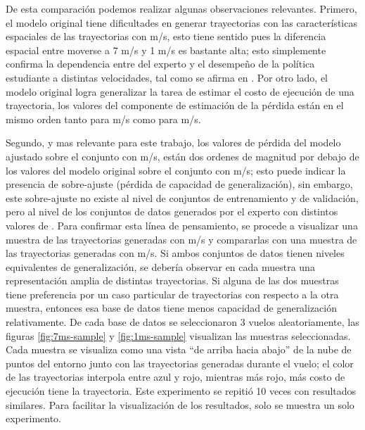 De esta comparación podemos realizar algunas observaciones relevantes. Primero, el modelo original tiene dificultades en generar trayectorias con las características espaciales de las trayectorias con  m/s, esto tiene sentido pues la diferencia espacial entre moverse a 7 m/s y 1 m/s es bastante alta; esto simplemente confirma la dependencia entre  del experto y el desempeño de la política estudiante a distintas velocidades, tal como se afirma en \cite{Loquercio2021}. Por otro lado, el modelo original logra generalizar la tarea de estimar el costo de ejecución de una trayectoria, los valores del componente de estimación de la pérdida están en el mismo orden tanto para  m/s como para  m/s. 

Segundo, y mas relevante para este trabajo, los valores de pérdida del modelo ajustado sobre el conjunto con  m/s, están dos ordenes de magnitud por debajo de los valores del modelo original sobre el conjunto con  m/s; esto puede indicar la presencia de sobre-ajuste (pérdida de capacidad de generalización), sin embargo, este sobre-ajuste no existe al nivel de conjuntos de entrenamiento y de validación, pero al nivel de los conjuntos de datos generados por el experto con distintos valores de . Para confirmar esta línea de pensamiento, se procede a visualizar una muestra de las trayectorias generadas con  m/s y compararlas con una muestra de las trayectorias generadas con  m/s. Si ambos conjuntos de datos tienen niveles equivalentes de generalización, se debería observar en cada muestra una representación amplia de distintas trayectorias. Si alguna de las dos muestras tiene preferencia por un caso particular de trayectorias con respecto a la otra muestra, entonces esa base de datos tiene menos capacidad de generalización relativamente. De cada base de datos se seleccionaron 3 vuelos aleatoriamente, las figuras \ref{fig:7ms-sample} y \ref{fig:1ms-sample} visualizan las muestras seleccionadas. Cada muestra se visualiza como una vista ``de arriba hacia abajo'' de la nube de puntos del entorno junto con las trayectorias generadas durante el vuelo; el color de las trayectorias interpola entre azul y rojo, mientras más rojo, más costo de ejecución tiene la trayectoria. Este experimento se repitió 10 veces con resultados similares. Para facilitar la visualización de los resultados, solo se muestra un solo experimento.

